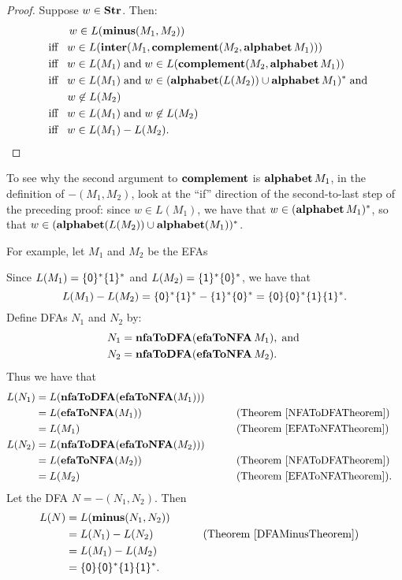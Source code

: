 \begin{proof}
Suppose $w\in\mathbf{Str}$.  Then:
\begin{align*}
&\hspace{.95cm} w\in L(\mathbf{minus}(M_1,M_2)) \\
&\mathrel{\;\;\allowbreak\mbox{iff}\allowbreak\;\;} w\in L(\mathbf{inter}(M_1,\mathbf{complement}(M_2,\mathbf{alphabet}\,M_1))) \\
&\mathrel{\;\;\allowbreak\mbox{iff}\allowbreak\;\;} w\in L(M_1)\;\allowbreak\mbox{and}\allowbreak\;w\in L(\mathbf{complement}(M_2,\mathbf{alphabet}\,M_1)) \\
&\mathrel{\;\;\allowbreak\mbox{iff}\allowbreak\;\;} w\in L(M_1)\;\allowbreak\mbox{and}\allowbreak\;w\in(\mathbf{alphabet}(L(M_2))\cup\mathbf{alphabet}\,M_1)^*\;\allowbreak\mbox{and}\allowbreak\; \\
&\qquad\;\; w\not\in L(M_2) \\
&\mathrel{\;\;\allowbreak\mbox{iff}\allowbreak\;\;} w\in L(M_1)\;\allowbreak\mbox{and}\allowbreak\;w\not\in L(M_2) \\
&\mathrel{\;\;\allowbreak\mbox{iff}\allowbreak\;\;} w\in L(M_1)-L(M_2) .
\end{align*}
\end{proof}

To see why the second argument to $\mathbf{complement}$ is
$\mathbf{alphabet}\,M_1$, in the definition of $\minus(M_1,M_2)$, look at
the ``if'' direction of the second-to-last step of the preceding
proof: since $w\in L(M_1)$, we have that $w\in(\mathbf{alphabet}\,M_1)^*$, so
that $w\in (\mathbf{alphabet}(L(M_2))\cup\mathbf{alphabet}(M_1))^*$.

For example, let $M_1$ and $M_2$ be the EFAs
\begin{center}

\end{center}
Since $L(M_1)=\{\mathsf{0}\}^*\{\mathsf{1}\}^*$ and
$L(M_2)=\{\mathsf{1}\}^*\{\mathsf{0}\}^*$, we have that
\begin{displaymath}
L(M_1)-L(M_2)=\{\mathsf{0}\}^*\{\mathsf{1}\}^*-\{\mathsf{1}\}^*\{\mathsf{0}\}^* =
\{\mathsf{0}\}\{\mathsf{0}\}^*\{\mathsf{1}\}\{\mathsf{1}\}^* .
\end{displaymath}
Define DFAs $N_1$ and $N_2$ by:
\begin{align*}
N_1 &= \mathbf{nfaToDFA}(\mathbf{efaToNFA}\,M_1) , \;\allowbreak\mbox{and}\allowbreak\; \\
N_2 &= \mathbf{nfaToDFA}(\mathbf{efaToNFA}\,M_2) .
\end{align*}
Thus we have that
\begin{alignat*}{2}
L(N_1) &= L(\mathbf{nfaToDFA}(\mathbf{efaToNFA}(M_1))) \\
       &= L(\mathbf{efaToNFA}(M_1)) && \qquad{\textrm{(Theorem~\ref{NFAToDFATheorem})}} \\
       &= L(M_1) && \qquad{\textrm{(Theorem~\ref{EFAToNFATheorem})}} \\
L(N_2) &= L(\mathbf{nfaToDFA}(\mathbf{efaToNFA}(M_2))) \\
       &= L(\mathbf{efaToNFA}(M_2)) && \qquad{\textrm{(Theorem~\ref{NFAToDFATheorem})}} \\
       &= L(M_2) && \qquad{\textrm{(Theorem~\ref{EFAToNFATheorem})}} .
\end{alignat*}
Let the DFA $N=\minus(N_1,N_2)$.
Then
\begin{alignat*}{2}
L(N) &= L(\mathbf{minus}(N_1,N_2)) \\
     &= L(N_1)-L(N_2) && \qquad{\textrm{(Theorem~\ref{DFAMinusTheorem})}} \\
     &= L(M_1)-L(M_2) \\
     &= \{\mathsf{0}\}\{\mathsf{0}\}^*\{\mathsf{1}\}\{\mathsf{1}\}^* .
\end{alignat*}

